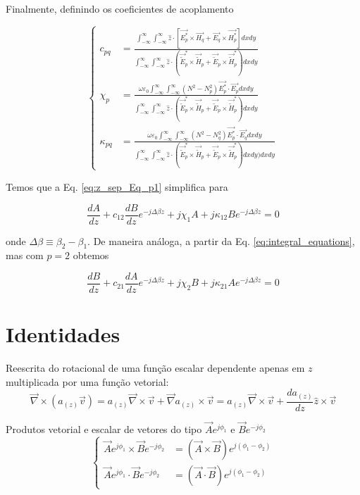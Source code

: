 \documentclass[11pt]{article} %
\newcommand{\diverg}{\vec{\nabla}}
\newcommand{\tildee}{ \vec{\tilde{E}}}
\newcommand{\tildeh}{ \vec{\tilde{H}}}
\newcommand{\epsz}{\varepsilon_0}
\newcommand{\couplingdenom}{ \int_{-\infty}^\infty \int_{-\infty}^\infty \hat{z}\cdot\left(\tildee_p^*\times\tildeh_p+\tildee_p\times\tildeh_p^*\right) dxdy }
\begin{document}
Finalmente, definindo os coeficientes de acoplamento

\begin{equation}
\label{eq:coupling_coeff}
\left\{
\begin{split}
c_{pq} &= \frac{\int_{-\infty}^\infty\int_{-\infty}^\infty \hat{z} \cdot \left[ \vec{E_p^*}\times\vec{H_q} + \vec{E_q}\times\vec{H_p^*} \right] dxdy}{\couplingdenom} \\
\chi_{p} &= \frac{\omega\epsz\int_{-\infty}^\infty\int_{-\infty}^\infty \left(N^2-N_p^2\right) \vec{E_p^*}\cdot\vec{E_p} dxdy}{\couplingdenom} \\
\kappa_{pq} &= \frac{\omega\epsz\int_{-\infty}^\infty\int_{-\infty}^\infty \left(N^2-N_q^2\right) \vec{E_p^*}\cdot\vec{E_q} dxdy}{\couplingdenom) dxdy}
\end{split}
\right.
\end{equation}

Temos que a Eq. \ref{eq:z_sep_Eq_p1} simplifica para

\begin{equation}
\frac{dA}{dz} + c_{12}\frac{dB}{dz}e^{-j\Delta\beta z} + j\chi_1A + j\kappa_{12}Be^{-j\Delta\beta z} = 0
\end{equation}

onde $\Delta\beta\equiv\beta_2-\beta_1$. De maneira análoga, a partir da Eq. \ref{eq:integral_equations}, mas com $p=2$ obtemos

\begin{equation}
\frac{dB}{dz} + c_{21}\frac{dA}{dz}e^{-j\Delta\beta z} + j\chi_2B + j\kappa_{21}Ae^{-j\Delta\beta z} = 0
\end{equation}

\section{Identidades}


Reescrita do rotacional de uma função escalar dependente apenas em $z$ multiplicada por uma função vetorial:
\begin{equation}\label{eq:rot_av}
\diverg\times\left(a_{(z)}\vec{v}\right) = a_{(z)}\diverg\times\vec{v} + \diverg a_{(z)}\times\vec{v} = a_{(z)}\diverg\times\vec{v} + \frac{da_{(z)}}{dz}\hat{z}\times\vec{v}
\end{equation}

Produtos vetorial e escalar de vetores do tipo $\vec{A}e^{j\phi_1}$ e $\vec{B}e^{-j\phi_2}$
\begin{equation} \label{eq:cross_dot_identity}
\left\{
\begin{split}
\vec{A}e^{j\phi_1}\times \vec{B}e^{-j\phi_2} &= (\vec{A}\times\vec{B})e^{j(\phi_1-\phi_2)} \\
\vec{A}e^{j\phi_1}\cdot \vec{B}e^{-j\phi_2} &= (\vec{A}\cdot\vec{B})e^{j(\phi_1-\phi_2)}
\end{split}
\right.
\end{equation}

\newpage

\printbibliography
\end{document}
